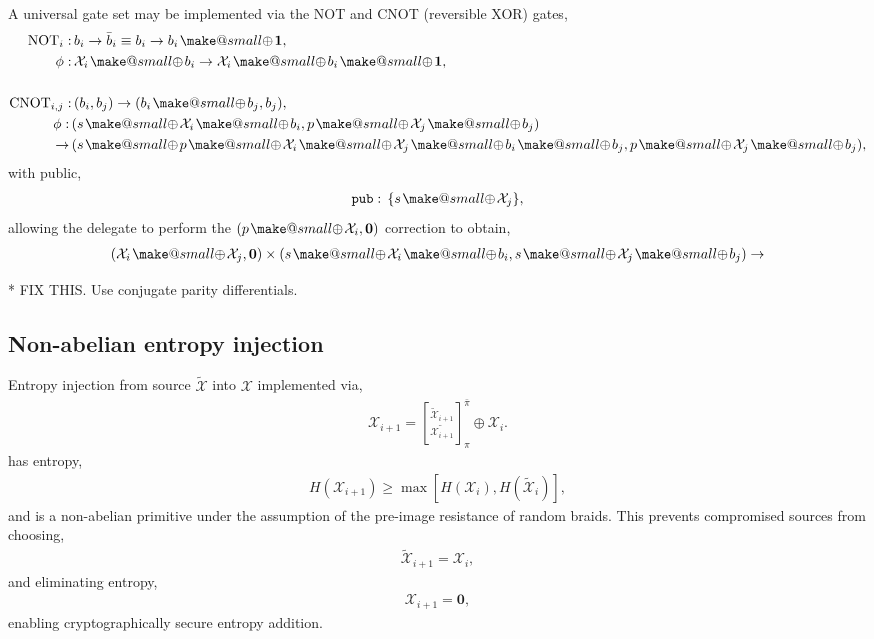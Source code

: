 \documentclass[twocolumn, aps, amsmath, amssymb, nofootinbib, superscriptaddress, longbibliography, doublefloatfix, table-of-contents, eqsecnum, rmp]{revtex4-2}
\makeatletter
\def\zerovec{\mathbf{0}}
\def\onevec{\mathbf{1}}
\newcommand{\stackbraid}[2]{{\genfrac{[}{]}{0pt}{}{{#1}}{{#2}}}^{\bar{\pi}}_{\pi}}
\newcommand{\soplus}{{{\hspace{1pt}}{\mathbin{\mathpalette\make@small{\mathbin\oplus}}}}{\hspace{1pt}}}
\newcommand{\make@small}[2]{%
  \vcenter{\hbox{%
    \scalebox{0.6}{$\m@th#1#2$}%
  }}%
}
\makeatother
\begin{document}
A universal gate set may be implemented via the NOT and CNOT (reversible XOR) gates,
\begin{align}
	\mathrm{NOT}_i:&\, b_i \to \bar{b}_i \equiv b_i \to b_i\soplus \onevec,\\
	\phi:&\, \mathcal{X}_i\soplus b_i \to \mathcal{X}_i\soplus b_i \soplus \onevec,\nonumber\\
	\nonumber\\
	\mathrm{CNOT}_{i,j}:&\, (b_i,b_j) \to (b_i\soplus b_j,b_j),\nonumber\\
	\phi:\, &(s\soplus \mathcal{X}_i\soplus b_i, p\soplus \mathcal{X}_j\soplus b_j)\nonumber\\
	\to\, &(s\soplus p \soplus \mathcal{X}_i \soplus \mathcal{X}_j \soplus b_i \soplus b_j, p\soplus \mathcal{X}_j\soplus b_j),\nonumber
\end{align}
with public,
\begin{align}
	\mathtt{pub}:\,\{s\soplus \mathcal{X}_j\},
\end{align}
allowing the delegate to perform the $(p\soplus\mathcal{X}_i,\zerovec)$ correction to obtain,
\begin{align}
	(\mathcal{X}_i\soplus\mathcal{X}_j,\zerovec) \times (s\soplus \mathcal{X}_i\soplus b_i, s\soplus \mathcal{X}_j\soplus b_j) \to 
\end{align}

* FIX THIS. Use conjugate parity differentials.

\subsection{Non-abelian entropy injection}

Entropy injection from source $\tilde{\mathcal{X}}$ into $\mathcal{X}$ implemented via,
\begin{align}
	\mathcal{X}_{i+1} = \stackbraid{\mathcal{\tilde X}_{i+1}}{\tilde{\mathcal{X}_{i+1}}} \oplus \mathcal{X}_i.
\end{align}
has entropy,
\begin{align}
	H(\mathcal{X}_{i+1}) \geq \max[H(\mathcal{X}_i),H(\tilde{\mathcal{X}}_i)],
\end{align}
and is a non-abelian primitive under the assumption of the pre-image resistance of random braids. This prevents compromised sources from choosing,
\begin{align}
	\tilde{\mathcal{X}}_{i+1}=\mathcal{X}_i,
\end{align}
and eliminating entropy,
\begin{align}
	\mathcal{X}_{i+1} = \zerovec,
\end{align}
enabling cryptographically secure entropy addition.
\end{document}

